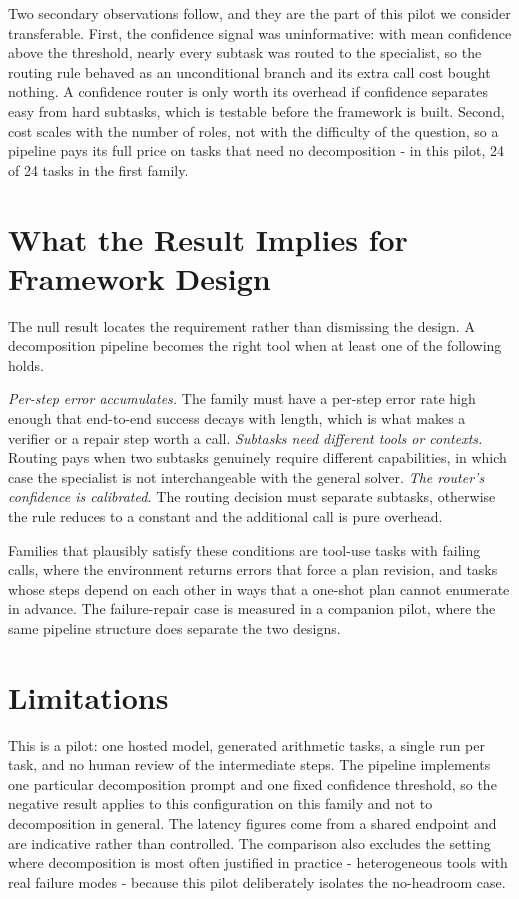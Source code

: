 \documentclass[runningheads,a4paper]{llncs}
\begin{document}
Two secondary observations follow, and they are the part of this pilot we consider transferable. First, the confidence signal was uninformative: with mean confidence above the threshold, nearly every subtask was routed to the specialist, so the routing rule behaved as an unconditional branch and its extra call cost bought nothing. A confidence router is only worth its overhead if confidence separates easy from hard subtasks, which is testable before the framework is built. Second, cost scales with the number of roles, not with the difficulty of the question, so a pipeline pays its full price on tasks that need no decomposition - in this pilot, 24 of 24 tasks in the first family.

\section{What the Result Implies for Framework Design}

The null result locates the requirement rather than dismissing the design. A decomposition pipeline becomes the right tool when at least one of the following holds.

\emph{Per-step error accumulates.} The family must have a per-step error rate high enough that end-to-end success decays with length, which is what makes a verifier or a repair step worth a call. \emph{Subtasks need different tools or contexts.} Routing pays when two subtasks genuinely require different capabilities, in which case the specialist is not interchangeable with the general solver. \emph{The router's confidence is calibrated.} The routing decision must separate subtasks, otherwise the rule reduces to a constant and the additional call is pure overhead.

Families that plausibly satisfy these conditions are tool-use tasks with failing calls, where the environment returns errors that force a plan revision, and tasks whose steps depend on each other in ways that a one-shot plan cannot enumerate in advance. The failure-repair case is measured in a companion pilot, where the same pipeline structure does separate the two designs.

\section{Limitations}

This is a pilot: one hosted model, generated arithmetic tasks, a single run per task, and no human review of the intermediate steps. The pipeline implements one particular decomposition prompt and one fixed confidence threshold, so the negative result applies to this configuration on this family and not to decomposition in general. The latency figures come from a shared endpoint and are indicative rather than controlled. The comparison also excludes the setting where decomposition is most often justified in practice - heterogeneous tools with real failure modes - because this pilot deliberately isolates the no-headroom case.
\end{document}
